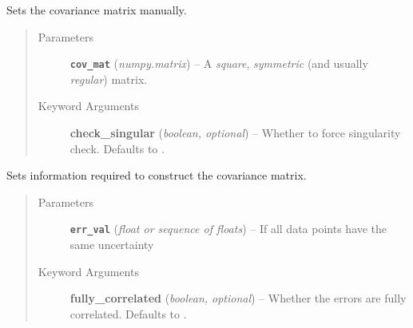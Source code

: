 \documentclass[a4paper,10pt,english]{sphinxmanual}
\begin{document}
\begin{fulllineitems}
\begin{fulllineitems}
\begin{quote}
\begin{description}
\end{description}\end{quote}

\end{fulllineitems}


\begin{fulllineitems}
\label{index:kafe.dataset.ErrorSource.make_from_matrix}
Sets the covariance matrix manually.
\begin{quote}\begin{description}
\item[{Parameters}] \leavevmode
\textbf{\texttt{cov\_mat}} (\emph{numpy.matrix}) -- A \emph{square}, \emph{symmetric} (and usually \emph{regular}) matrix.

\item[{Keyword Arguments}] \leavevmode
\textbf{check\_singular} (\emph{boolean, optional}) --
Whether to force singularity check. Defaults to .

\end{description}\end{quote}

\end{fulllineitems}


\begin{fulllineitems}
\label{index:kafe.dataset.ErrorSource.make_from_val}
Sets information required to construct the covariance matrix.
\begin{quote}\begin{description}
\item[{Parameters}] \leavevmode
\textbf{\texttt{err\_val}} (\emph{float or sequence of floats}) -- If all data points have the same uncertainty

\item[{Keyword Arguments}] \leavevmode
\textbf{fully\_correlated} (\emph{boolean, optional}) --
Whether the errors are fully correlated. Defaults to .

\end{description}\end{quote}

\end{fulllineitems}


\end{fulllineitems}
\end{document}
